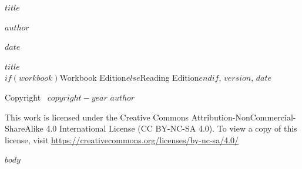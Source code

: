 \documentclass[11pt,twoside,$if(workbook)$openright$else$openany$endif$]{book}
\begin{document}
\frontmatter

\thispagestyle{empty}
\null\vfill
\begin{center}
  {\fontsize{24.88pt}{37.3pt}\selectfont\bfseries
   \parbox{125pt}{\centering $title$}\par}
  \vspace{24pt}
  {\Large $author$\par}
  \vspace{12pt}
  {\large $date$\par}
\end{center}
\vfill\vfill
\clearpage

\thispagestyle{empty}
\null\vfill
{\small\raggedright
\textit{$title$}\\
$if(workbook)$Workbook Edition$else$Reading Edition$endif$, $version$, $date$\par
\medskip
Copyright \textcopyright\ $copyright-year$ $author$\par
\medskip
This work is licensed under the Creative Commons
Attribution-NonCommercial-ShareAlike 4.0 International License
(CC BY-NC-SA 4.0). To view a copy of this license, visit
\url{https://creativecommons.org/licenses/by-nc-sa/4.0/}\par}
\clearpage

\tableofcontents

\mainmatter
$body$
\end{document}
